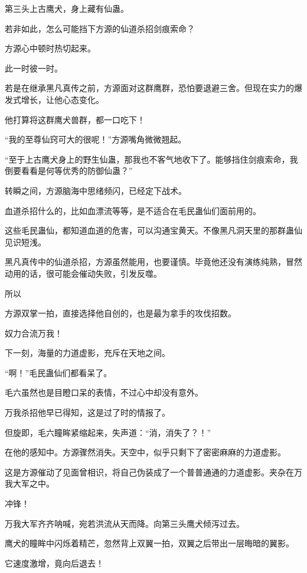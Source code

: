 
\begin{this_body}

第三头上古鹰犬，身上藏有仙蛊。

若非如此，怎么可能挡下方源的仙道杀招剑痕索命？

方源心中顿时热切起来。

此一时彼一时。

若是在继承黑凡真传之前，方源面对这群鹰群，恐怕要退避三舍。但现在实力的爆发式增长，让他心态变化。

他打算将这群鹰犬兽群，都一口吃下！

“我的至尊仙窍可大的很呢！”方源嘴角微微翘起。

“至于上古鹰犬身上的野生仙蛊，那我也不客气地收下了。能够挡住剑痕索命，我倒要看看是何等优秀的防御仙蛊？”

转瞬之间，方源脑海中思绪频闪，已经定下战术。

血道杀招什么的，比如血漂流等等，是不适合在毛民蛊仙们面前用的。

这些毛民蛊仙，都知道血道的危害，可以沟通宝黄天。不像黑凡洞天里的那群蛊仙见识短浅。

黑凡真传中的仙道杀招，方源虽然能用，也要谨慎。毕竟他还没有演练纯熟，冒然动用的话，很可能会催动失败，引发反噬。

所以

方源双掌一拍，直接选择他自创的，也是最为拿手的攻伐招数。

奴力合流万我！

下一刻，海量的力道虚影，充斥在天地之间。

“啊！”毛民蛊仙们都看呆了。

毛六虽然也是目瞪口呆的表情，不过心中却没有意外。

万我杀招他早已得知，这是过了时的情报了。

但旋即，毛六瞳眸紧缩起来，失声道：“消，消失了？！”

在他的感知中。方源骤然消失。天空中，似乎只剩下了密密麻麻的力道虚影。

这是方源催动了见面曾相识，将自己伪装成了一个普普通通的力道虚影。夹杂在万我大军之中。

冲锋！

万我大军齐齐呐喊，宛若洪流从天而降。向第三头鹰犬倾泻过去。

鹰犬的瞳眸中闪烁着精芒，忽然背上双翼一拍，双翼之后带出一层晦暗的翼影。

它速度激增，竟向后退去！


\end{this_body}
